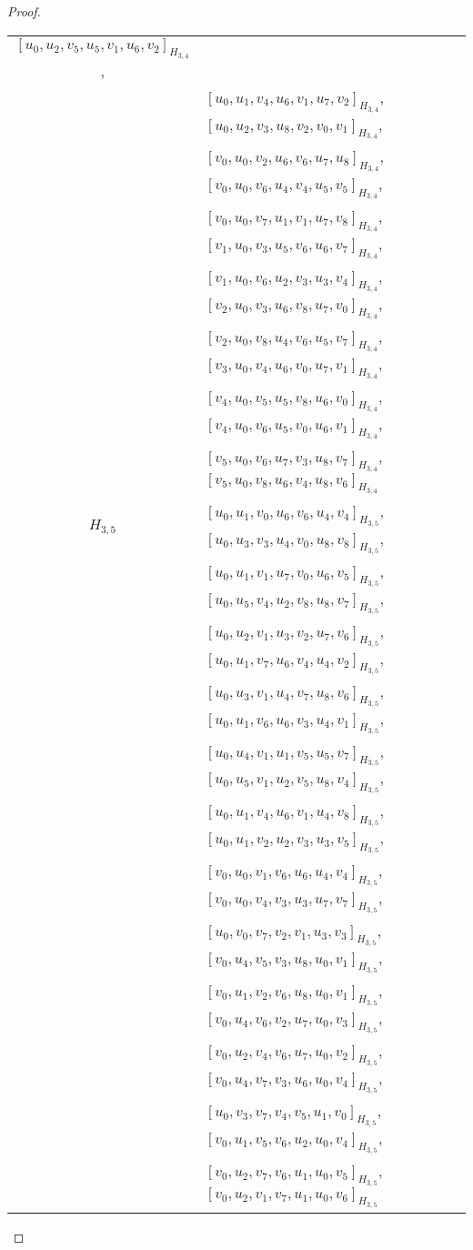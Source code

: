 \begin{subappendices}
\begin{proof}
{\begin{longtable}{|c|l|}
  $[u_0, u_2, v_5, u_5, v_1, u_6, v_2]_{H_{3,4}}$, \\* &
  $[u_0, u_1, v_4, u_6, v_1, u_7, v_2]_{H_{3,4}}$,
  $[u_0, u_2, v_3, u_8, v_2, v_0, v_1]_{H_{3,4}}$, \\* &
  $[v_0, u_0, v_2, u_6, v_6, u_7, u_8]_{H_{3,4}}$,
  $[v_0, u_0, v_6, u_4, v_4, u_5, v_5]_{H_{3,4}}$, \\* &
  $[v_0, u_0, v_7, u_1, v_1, u_7, v_8]_{H_{3,4}}$,
  $[v_1, u_0, v_3, u_5, v_6, u_6, v_7]_{H_{3,4}}$, \\* &
  $[v_1, u_0, v_6, u_2, v_3, u_3, v_4]_{H_{3,4}}$,
  $[v_2, u_0, v_3, u_6, v_8, u_7, v_0]_{H_{3,4}}$, \\* &
  $[v_2, u_0, v_8, u_4, v_6, u_5, v_7]_{H_{3,4}}$,
  $[v_3, u_0, v_4, u_6, v_0, u_7, v_1]_{H_{3,4}}$, \\* &
  $[v_4, u_0, v_5, u_5, v_8, u_6, v_0]_{H_{3,4}}$,
  $[v_4, u_0, v_6, u_5, v_0, u_6, v_1]_{H_{3,4}}$, \\* &
  $[v_5, u_0, v_6, u_7, v_3, u_8, v_7]_{H_{3,4}}$,
  $[v_5, u_0, v_8, u_6, v_4, u_8, v_6]_{H_{3,4}}$
\\ \hline
$H_{3,5}$ &
  $[u_0, u_1, v_0, u_6, v_6, u_4, v_4]_{H_{3,5}}$,
  $[u_0, u_3, v_3, u_4, v_0, u_8, v_8]_{H_{3,5}}$, \\* &
  $[u_0, u_1, v_1, u_7, v_0, u_6, v_5]_{H_{3,5}}$,
  $[u_0, u_5, v_4, u_2, v_8, u_8, v_7]_{H_{3,5}}$, \\* &
  $[u_0, u_2, v_1, u_3, v_2, u_7, v_6]_{H_{3,5}}$,
  $[u_0, u_1, v_7, u_6, v_4, u_4, v_2]_{H_{3,5}}$, \\* &
  $[u_0, u_3, v_1, u_4, v_7, u_8, v_6]_{H_{3,5}}$,
  $[u_0, u_1, v_6, u_6, v_3, u_4, v_1]_{H_{3,5}}$, \\* &
  $[u_0, u_4, v_1, u_1, v_5, u_5, v_7]_{H_{3,5}}$,
  $[u_0, u_5, v_1, u_2, v_5, u_8, v_4]_{H_{3,5}}$, \\* &
  $[u_0, u_1, v_4, u_6, v_1, u_4, v_8]_{H_{3,5}}$,
  $[u_0, u_1, v_2, u_2, v_3, u_3, v_5]_{H_{3,5}}$, \\* &
  $[v_0, u_0, v_1, v_6, u_6, u_4, v_4]_{H_{3,5}}$,
  $[v_0, u_0, v_4, v_3, u_3, u_7, v_7]_{H_{3,5}}$, \\* &
  $[u_0, v_0, v_7, v_2, v_1, u_3, v_3]_{H_{3,5}}$,
  $[v_0, u_4, v_5, v_3, u_8, u_0, v_1]_{H_{3,5}}$, \\* &
  $[v_0, u_1, v_2, v_6, u_8, u_0, v_1]_{H_{3,5}}$,
  $[v_0, u_4, v_6, v_2, u_7, u_0, v_3]_{H_{3,5}}$, \\* &
  $[v_0, u_2, v_4, v_6, u_7, u_0, v_2]_{H_{3,5}}$,
  $[v_0, u_4, v_7, v_3, u_6, u_0, v_4]_{H_{3,5}}$, \\* &
  $[u_0, v_3, v_7, v_4, v_5, u_1, v_0]_{H_{3,5}}$,
  $[v_0, u_1, v_5, v_6, u_2, u_0, v_4]_{H_{3,5}}$, \\* &
  $[v_0, u_2, v_7, v_6, u_1, u_0, v_5]_{H_{3,5}}$,
  $[v_0, u_2, v_1, v_7, u_1, u_0, v_6]_{H_{3,5}}$
\\ \hline
\end{longtable}
}
\end{proof}


\end{subappendices}
